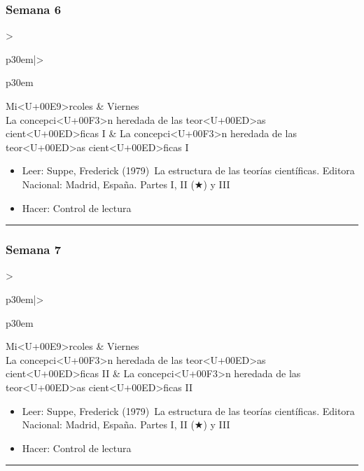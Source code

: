 \documentclass[spanish,]{article}
\begin{document}
\subsubsection{Semana 6}\label{semana-6}

\begin{tabular}{>{\raggedright\arraybackslash}p{30em}|>{\raggedright\arraybackslash}p{30em}}
\hline
Mi<U+00E9>rcoles & Viernes\\
\hline
La concepci<U+00F3>n heredada de las teor<U+00ED>as cient<U+00ED>ficas I & La concepci<U+00F3>n heredada de las teor<U+00ED>as cient<U+00ED>ficas I\\
\hline
\end{tabular}

\begin{itemize}
\item
  Leer: Suppe, Frederick (1979)~La estructura de las teorías
  científicas. Editora Nacional: Madrid, España. Partes I, II (★) y III
\item
  Hacer: Control de lectura
\end{itemize}

\begin{center}\rule{0.5\linewidth}{\linethickness}\end{center}

\subsubsection{Semana 7}\label{semana-7}

\begin{tabular}{>{\raggedright\arraybackslash}p{30em}|>{\raggedright\arraybackslash}p{30em}}
\hline
Mi<U+00E9>rcoles & Viernes\\
\hline
La concepci<U+00F3>n heredada de las teor<U+00ED>as cient<U+00ED>ficas II & La concepci<U+00F3>n heredada de las teor<U+00ED>as cient<U+00ED>ficas II\\
\hline
\end{tabular}

\begin{itemize}
\item
  Leer: Suppe, Frederick (1979)~La estructura de las teorías
  científicas. Editora Nacional: Madrid, España. Partes I, II (★) y III
\item
  Hacer: Control de lectura
\end{itemize}

\begin{center}\rule{0.5\linewidth}{\linethickness}\end{center}
\end{document}
